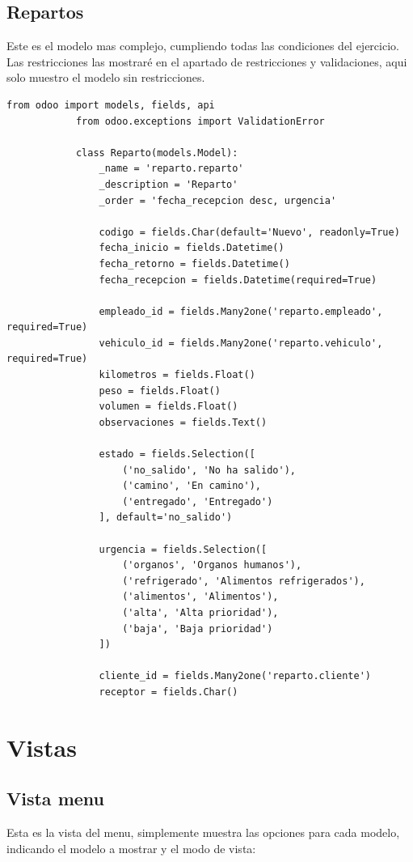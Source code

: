 \documentclass[a4paper, 11pt]{article}
\begin{document}
        \subsection{Repartos}
        Este es el modelo mas complejo, cumpliendo todas las condiciones del ejercicio. Las restricciones las mostraré en el apartado de restricciones y validaciones, aqui solo muestro el modelo sin restricciones.
        \begin{lstlisting}[frame=single,breaklines=true]
            from odoo import models, fields, api
            from odoo.exceptions import ValidationError

            class Reparto(models.Model):
                _name = 'reparto.reparto'
                _description = 'Reparto'
                _order = 'fecha_recepcion desc, urgencia'

                codigo = fields.Char(default='Nuevo', readonly=True)
                fecha_inicio = fields.Datetime()
                fecha_retorno = fields.Datetime()
                fecha_recepcion = fields.Datetime(required=True)

                empleado_id = fields.Many2one('reparto.empleado', required=True)
                vehiculo_id = fields.Many2one('reparto.vehiculo', required=True)
                kilometros = fields.Float()
                peso = fields.Float()
                volumen = fields.Float()
                observaciones = fields.Text()

                estado = fields.Selection([
                    ('no_salido', 'No ha salido'),
                    ('camino', 'En camino'),
                    ('entregado', 'Entregado')
                ], default='no_salido')

                urgencia = fields.Selection([
                    ('organos', 'Organos humanos'),
                    ('refrigerado', 'Alimentos refrigerados'),
                    ('alimentos', 'Alimentos'),
                    ('alta', 'Alta prioridad'),
                    ('baja', 'Baja prioridad')
                ])

                cliente_id = fields.Many2one('reparto.cliente')
                receptor = fields.Char()
        \end{lstlisting}


\section{Vistas}

    \subsection{Vista menu}
Esta es la vista del menu, simplemente muestra las opciones para cada modelo, indicando el modelo a mostrar y el modo de vista:
\end{document}
